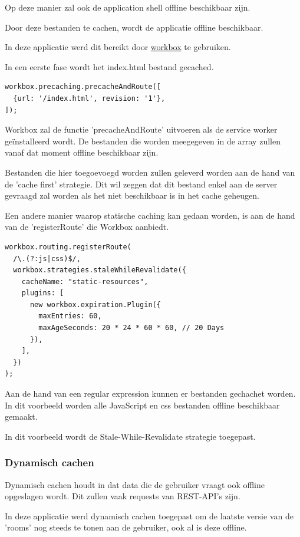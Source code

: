 			Op deze manier zal ook de application shell offline beschikbaar zijn.
			
			Door deze bestanden te cachen, wordt de applicatie offline beschikbaar.
			
			In deze applicatie werd dit bereikt door \href{https://developers.google.com/web/tools/workbox}{workbox} te gebruiken.
			
			In een eerste fase wordt het index.html bestand gecached.
\begin{lstlisting}
workbox.precaching.precacheAndRoute([
  {url: '/index.html', revision: '1'},
]);
\end{lstlisting}
		
			Workbox zal de functie 'precacheAndRoute' uitvoeren als de service worker geïnstalleerd wordt. De bestanden die worden meegegeven in de array zullen vanaf dat moment offline beschikbaar zijn.
			\autocite{Workbox2020a}
			
			Bestanden die hier toegoevoegd worden zullen geleverd worden aan de hand van de 'cache first' strategie. Dit wil zeggen dat dit bestand enkel aan de server gevraagd zal worden als het niet beschikbaar is in het cache geheugen.
			
			Een andere manier waarop statische caching kan gedaan worden, is aan de hand van de 'registerRoute' die Workbox aanbiedt. 
			
\begin{lstlisting}
workbox.routing.registerRoute(
  /\.(?:js|css)$/,
  workbox.strategies.staleWhileRevalidate({
    cacheName: "static-resources",
    plugins: [
      new workbox.expiration.Plugin({
        maxEntries: 60,
        maxAgeSeconds: 20 * 24 * 60 * 60, // 20 Days
      }),
    ],
  })
);
\end{lstlisting}
			
			Aan de hand van een regular expression kunnen er bestanden gechachet worden. In dit voorbeeld worden alle JavaScript en css bestanden offline beschikbaar gemaakt.
			
			In dit voorbeeld wordt de Stale-While-Revalidate strategie toegepast.
			\autocite{Workbox2020b}
			
		\subsubsection{Dynamisch cachen}
			Dynamisch cachen houdt in dat data die de gebruiker vraagt ook offline opgeslagen wordt. Dit zullen vaak requests van REST-API's zijn.
			
			In deze applicatie werd dynamisch cachen toegepast om de laatste versie van de 'rooms' nog steeds te tonen aan de gebruiker, ook al is deze offline.
			
